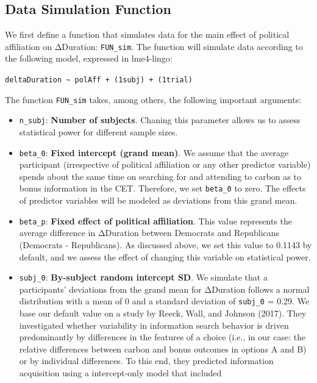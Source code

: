 \documentclass[
  letterpaper,
  DIV=11,
  numbers=noendperiod]{scrartcl}
\begin{document}
\subsection{Data Simulation Function}\label{data-simulation-function}

We first define a function that simulates data for the main effect of
political affiliation on ΔDuration: \texttt{FUN\_sim}. The function will
simulate data according to the following model, expressed in lme4-lingo:

\texttt{deltaDuration\ \textasciitilde{}\ polAff\ +\ (1\textbar{}subj)\ +\ (1\textbar{}trial)}

The function \texttt{FUN\_sim} takes, among others, the following
important arguments:

\begin{itemize}
\item
  \texttt{n\_subj}: \textbf{Number of subjects}. Chaning this parameter
  allows us to assess statistical power for different sample sizes.
\item
  \texttt{beta\_0}: \textbf{Fixed intercept (grand mean)}. We assume
  that the average participant (irrespective of political affiliation or
  any other predictor variable) spends about the same time on searching
  for and attending to carbon as to bonus information in the CET.
  Therefore, we set \texttt{beta\_0} to zero. The effects of predictor
  variables will be modeled as deviations from this grand mean.
\item
  \texttt{beta\_p}: \textbf{Fixed effect of political affiliation}. This
  value represents the average difference in ΔDuration between Democrats
  and Republicans (Democrats - Republicans). As discussed above, we set
  this value to 0.1143 by default, and we assess the effect of changing
  this variable on statistical power.
\item
  \texttt{subj\_0}: \textbf{By-subject random intercept SD}. We simulate
  that a participants' deviations from the grand mean for ΔDuration
  follows a normal distribution with a mean of 0 and a standard
  deviation of \texttt{subj\_0} = 0.29. We base our default value on a
  study by Reeck, Wall, and Johnson (2017). They investigated whether
  variability in information search behavior is driven predominantly by
  differences in the features of a choice (i.e., in our case: the
  relative differences between carbon and bonus outcomes in options A
  and B) or by individual differences. To this end, they predicted
  information acquisition using a intercept-only model that included

\end{itemize}
\end{document}
